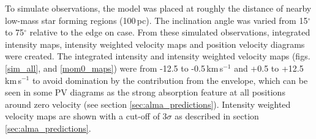 \documentclass[useAMS,usenatbib]{mn2e}
\begin{document}
To simulate observations, the model was placed at roughly the distance of nearby low-mass star forming regions (100$\,$pc). The inclination angle was varied from 15$^\circ$ to 75$^\circ$ relative to the edge on case. From these simulated observations, integrated intensity maps, intensity weighted velocity maps and position velocity diagrams were created. The integrated intensity and  intensity weighted velocity maps (figs. \ref{sim_all}, and \ref{mom0_maps}) were from -12.5 to -0.5$\,$km$\,$s$^{-1}$ and +0.5 to +12.5$\,$km$\,$s$^{-1}$ to avoid domination by the contribution from the envelope, which can be seen in some PV diagrams as the strong absorption feature at all positions around zero velocity (see section \ref{sec:alma_predictions}). Intensity weighted velocity maps are shown with a cut-off of 3$\sigma$ as described in section \ref{sec:alma_predictions}.\smallskip
\end{document}
